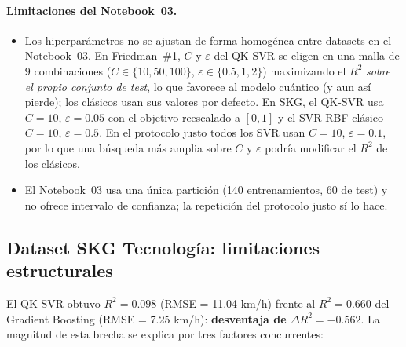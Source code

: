 \begin{table}[ht]
\centering
{}
\caption{Comparativa de regresión cuántica vs clásica en SKG y Friedman~\#1. El mejor clásico incluye XGBoost, Random Forest, SVR-RBF y Ridge.}
\label{tab:regresion_3ds}
\end{table}

\paragraph{Limitaciones del Notebook~03.}
\begin{itemize}
  \item Los hiperparámetros no se ajustan de forma homogénea entre datasets en el Notebook~03. En Friedman~\#1, $C$ y $\varepsilon$ del QK-SVR se eligen en una malla de 9 combinaciones ($C\in\{10,50,100\}$, $\varepsilon\in\{0.5,1,2\}$) maximizando el $R^2$ \emph{sobre el propio conjunto de test}, lo que favorece al modelo cuántico (y aun así pierde); los clásicos usan sus valores por defecto. En SKG, el QK-SVR usa $C=10$, $\varepsilon=0.05$ con el objetivo reescalado a $[0,1]$ y el SVR-RBF clásico $C=10$, $\varepsilon=0.5$. En el protocolo justo todos los SVR usan $C=10$, $\varepsilon=0.1$, por lo que una búsqueda más amplia sobre $C$ y $\varepsilon$ podría modificar el $R^2$ de los clásicos.
  \item El Notebook~03 usa una única partición (140 entrenamientos, 60 de test) y no ofrece intervalo de confianza; la repetición del protocolo justo sí lo hace.
\end{itemize}

\subsection{Dataset SKG Tecnología: limitaciones estructurales}

El QK-SVR obtuvo $R^2 = 0.098$ (RMSE = 11.04 km/h) frente al $R^2 = 0.660$ del Gradient Boosting (RMSE = 7.25 km/h): \textbf{desventaja de $\Delta R^2 = -0.562$}. La magnitud de esta brecha se explica por tres factores concurrentes:

